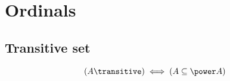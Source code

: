 \def\topic{}

\section{Ordinals}
\subsection{Transitive set}
\begin{definition}
\label{def:transitive through power}
\[
(A \transitive)\iff (A\subseteq \power A)
\]
\end{definition}


